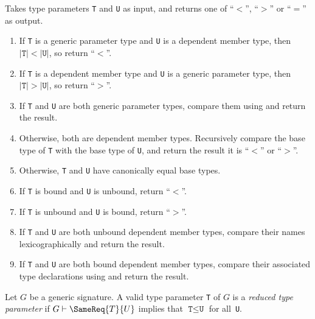 \documentclass[../generics]{subfiles}
\begin{document}
\begin{algorithm}\label{type parameter order}
Takes type parameters \texttt{T} and \texttt{U} as input, and returns one of ``$<$'', ``$>$'' or ``$=$'' as output.
\begin{enumerate}
\item If \texttt{T} is a generic parameter type and \texttt{U} is a dependent member type, then $|\texttt{T}|<|\texttt{U}|$, so return ``$<$''.
\item If \texttt{T} is a dependent member type and \texttt{U} is a generic parameter type, then $|\texttt{T}|>|\texttt{U}|$, so return ``$>$''.
\item If \texttt{T} and \texttt{U} are both generic parameter types, compare them using  and return the result.
\item Otherwise, both are dependent member types. Recursively compare the base type of \texttt{T} with the base type of \texttt{U}, and return the result it is ``$<$'' or ``$>$''.

\item Otherwise, \texttt{T} and \texttt{U} have canonically equal base types.

\item If \texttt{T} is bound and \texttt{U} is unbound, return ``$<$''.
\item If \texttt{T} is unbound and \texttt{U} is bound, return ``$>$''.
\item If \texttt{T} and \texttt{U} are both unbound dependent member types, compare their names lexicographically and return the result.
\item If \texttt{T} and \texttt{U} are both bound dependent member types, compare their associated type declarations using  and return the result.
\end{enumerate}
\end{algorithm}

\begin{definition}
Let $G$ be a generic signature. A valid type parameter \texttt{T} of $G$ is a \emph{reduced type parameter} if $G\vdash\SameReq{T}{U}$ implies that $\texttt{T}\leq\texttt{U}$ for all~\texttt{U}.
\end{definition}
\end{document}
